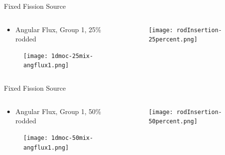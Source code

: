 
\begin{frame}[t]{Fixed Fission Source}

\begin{columns}
    \begin{column}{0.6\textwidth}
        \begin{itemize}
            \item Angular Flux, Group 1, 25\% rodded
        \end{itemize}
        \begin{figure}[H]
            \centering
            \texttt{[image: 1dmoc-25mix-angflux1.png]}
        \end{figure}
    \end{column}
    \begin{column}{0.4\textwidth}
        \begin{figure}[H]
            \centering
            \texttt{[image: rodInsertion-25percent.png]}
        \end{figure}
    \end{column}
\end{columns}

\end{frame}


\begin{frame}[t]{Fixed Fission Source}

\begin{columns}
    \begin{column}{0.6\textwidth}
        \begin{itemize}
            \item Angular Flux, Group 1, 50\% rodded
        \end{itemize}
        \begin{figure}[H]
            \centering
            \texttt{[image: 1dmoc-50mix-angflux1.png]}
        \end{figure}
    \end{column}
    \begin{column}{0.4\textwidth}
        \begin{figure}[H]
            \centering
            \texttt{[image: rodInsertion-50percent.png]}
        \end{figure}
    \end{column}
\end{columns}

\end{frame}

